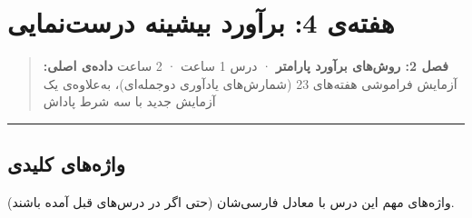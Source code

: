 \section{\texorpdfstring{هفته‌ی 4: برآورد بیشینه درست‌نمایی }{هفته‌ی 4: برآورد بیشینه درست‌نمایی (Maximum Likelihood)}}

\begin{quote}
\textbf{فصل 2: روش‌های برآورد پارامتر} · درس 1 ساعت ·  2 ساعت
\textbf{داده‌ی اصلی:} آزمایش فراموشی هفته‌های 2\lr{--}3 (شمارش‌های یادآوری
دوجمله‌ای)، به‌علاوه‌ی یک آزمایش  جدید با سه شرط پاداش
\end{quote}

\begin{center}\rule{0.5\linewidth}{0.5pt}\end{center}

\subsection{واژه‌های کلیدی}

واژه‌های مهم این درس با معادل فارسی‌شان (حتی اگر در درس‌های قبل آمده
باشند).

